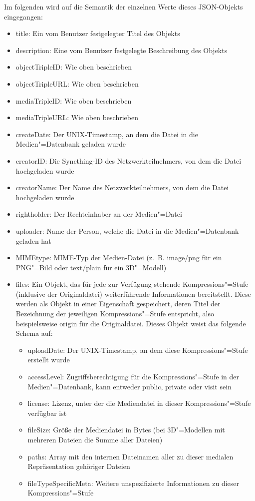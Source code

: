 Im folgenden wird auf die Semantik der einzelnen Werte dieses JSON-Objekts eingegangen:
\begin{itemize}
\item {\ttfamily title}: Ein vom Benutzer festgelegter Titel des Objekts
\item {\ttfamily description}: Eine vom Benutzer festgelegte Beschreibung des Objekts
\item {\ttfamily objectTripleID}: Wie oben beschrieben
\item {\ttfamily objectTripleURL}: Wie oben beschrieben
\item {\ttfamily mediaTripleID}: Wie oben beschrieben
\item {\ttfamily mediaTripleURL}: Wie oben beschrieben
\item {\ttfamily createDate}: Der UNIX-Timestamp, an dem die Datei in die Medien"=Datenbank geladen wurde
\item {\ttfamily creatorID}: Die Syncthing-ID des Netzwerkteilnehmers, von dem die Datei hochgeladen wurde
\item {\ttfamily creatorName}: Der Name des Netzwerkteilnehmers, von dem die Datei hochgeladen wurde
\item {\ttfamily rightholder}: Der Rechteinhaber an der Medien"=Datei
\item {\ttfamily uploader}: Name der Person, welche die Datei in die Medien"=Datenbank geladen hat
\item {\ttfamily MIMEtype}: MIME-Typ der Medien-Datei (z.~B. \glqq{}image/png\grqq{} für ein PNG"=Bild oder \glqq{}text/plain\grqq{} für ein 3D"=Modell)
\item {\ttfamily files}: Ein Objekt, das für jede zur Verfügung stehende Kompressions"=Stufe (inklusive der Originaldatei) weiterführende Informationen bereitstellt. Diese werden als Objekt in einer Eigenschaft gespeichert, deren Titel der Bezeichnung der jeweiligen Kompressions"=Stufe entspricht, also beispielsweise {\ttfamily origin} für die Originaldatei. Dieses Objekt weist das folgende Schema auf:
	\begin{itemize}
	\item {\ttfamily uploadDate}: Der UNIX-Timestamp, an dem diese Kompressions"=Stufe erstellt wurde
	\item {\ttfamily accessLevel}: Zugriffsberechtigung für die Kompressions"=Stufe in der Medien"=Datenbank, kann entweder {\ttfamily public}, {\ttfamily private} oder {\ttfamily visit} sein
	\item {\ttfamily license}: Lizenz, unter der die Mediendatei in dieser Kompressions"=Stufe verfügbar ist
	\item {\ttfamily fileSize}: Größe der Mediendatei in Bytes (bei 3D"=Modellen mit mehreren Dateien die Summe aller Dateien)
	\item {\ttfamily paths}: Array mit den internen Dateinamen aller zu dieser medialen Repräsentation gehöriger Dateien
	\item {\ttfamily fileTypeSpecificMeta}: Weitere unspezifizierte Informationen zu dieser Kompressions"=Stufe
	\end{itemize}
\end{itemize}

